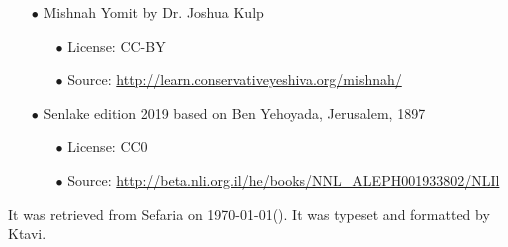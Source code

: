 \documentclass[12pt, openany]{book}
\newcommand{\partname}[1]{}
\newcommand{\sethebfont}{
\fontsize{10.5pt}{13.1pt} \selectfont
}
\newcommand{\twocol}[1]{
	{\sethebfont \begin{multicols}{2}
			#1
	\end{multicols}}	
}
\begin{document}
\begin{minipage}[b][\textheight][b]{\textwidth}
\begin{english}
\begin{itemize}
\begin{itemize}
\end{itemize}
\item[$\bullet$] Mishnah Yomit by Dr. Joshua Kulp
\begin{itemize}
\item[$\bullet$] License: CC-BY
\item[$\bullet$] Source: \url{http://learn.conservativeyeshiva.org/mishnah/}
\end{itemize}
\item[$\bullet$] Senlake edition 2019 based on Ben Yehoyada, Jerusalem, 1897
\begin{itemize}
\item[$\bullet$] License: CC0
\item[$\bullet$] Source: \url{http://beta.nli.org.il/he/books/NNL_ALEPH001933802/NLIl}
\end{itemize}
\end{itemize}
		It was retrieved from Sefaria on \today\space \texthebrew{(\Hebrewtoday)}.  It was typeset and formatted by Ktavi.
		\clearpage
		
	\end{english}
\end{minipage}

\titlelabel{\thetitle\quad}
{\small \tableofcontents}


\clearpage
\mainmatter
{}

\renewcommand{\partname}[1]{אסתר}
\twocol{\clearpage}
\end{document}

